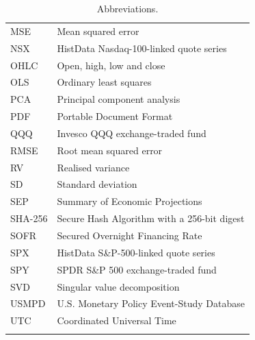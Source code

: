 {\begin{longtable}{@{}L{27mm}L{133.5mm}@{}}
MSE & Mean squared error \\ \hline
NSX & HistData Nasdaq-100-linked quote series \\ \hline
OHLC & Open, high, low and close \\ \hline
OLS & Ordinary least squares \\ \hline
PCA & Principal component analysis \\ \hline
PDF & Portable Document Format \\ \hline
QQQ & Invesco QQQ exchange-traded fund \\ \hline
RMSE & Root mean squared error \\ \hline
RV & Realised variance \\ \hline
SD & Standard deviation \\ \hline
SEP & Summary of Economic Projections \\ \hline
SHA-256 & Secure Hash Algorithm with a 256-bit digest \\ \hline
SOFR & Secured Overnight Financing Rate \\ \hline
SPX & HistData S\&P-500-linked quote series \\ \hline
SPY & SPDR S\&P 500 exchange-traded fund \\ \hline
SVD & Singular value decomposition \\ \hline
USMPD & U.S. Monetary Policy Event-Study Database \\ \hline
UTC & Coordinated Universal Time \\ \hline
{}\bottomrule
\caption[Abbreviations]{Abbreviations.}\label{tab:abbreviations}\\
\end{longtable}}
